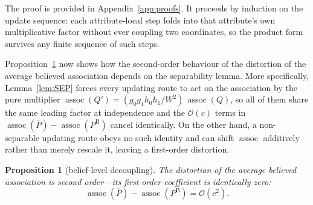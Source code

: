 \documentclass[a4paper,fleqn]{cas-sc}
\newtheorem{proposition}{Proposition}
\theoremstyle{remark}
\theoremstyle{definition}
\newcommand{\PB}{P^{\mathrm{B}}}
\newcommand{\Pbar}{\overline{P}}
\newcommand{\assoc}{\operatorname{assoc}}
\newcommand{\bigO}{\mathcal{O}}
\newcommand{\anchor}[1]{}
\begin{document}
The proof is provided in Appendix~\ref{app:proofs}. It proceeds by induction on the update
sequence: each attribute-local step folds into that attribute's own multiplicative factor
without ever coupling two coordinates, so the product form survives any finite sequence of such
steps. 

Proposition~\ref{prop:DEC} now shows how the second-order behaviour of the distortion of the average believed association depends on the separability lemma. More specifically, Lemma~\ref{lem:SEP} forces every updating route to act
on the association by the pure multiplier $\assoc(Q')=(g_0g_1h_0h_1/W^{2})\,\assoc(Q)$, so all of them share the same leading factor at independence and the $\bigO(c)$ terms in $\assoc(\Pbar)-\assoc(\PB)$ cancel identically. On the other hand, a non-separable updating route obeys no such
identity and can shift $\assoc$ additively rather than merely rescale it, leaving a first-order distortion.

\renewcommand{\theproposition}{DEC}%
\begin{proposition}[belief-level decoupling]\label{prop:DEC}
The distortion of the average believed association is second order---its first-order coefficient is
identically zero:
\[
  \assoc(\Pbar)-\assoc(\PB)=\bigO(c^{2}).
\]
\anchor{Prop.~DEC}
\end{proposition}
\end{document}
